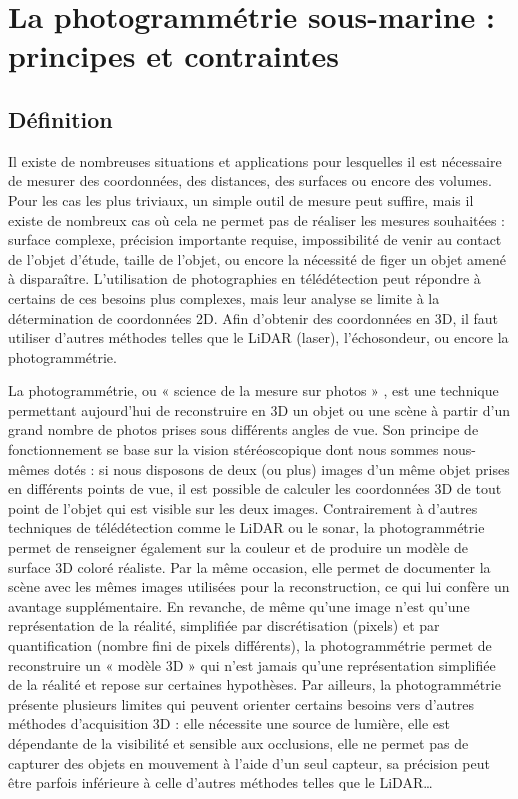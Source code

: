 \newpage

\section[La photogrammétrie sous-marine : principes et contraintes]{La photogrammétrie sous-marine : principes et contraintes}\label{methodes.2}

\subsection{Définition}

Il existe de nombreuses situations et applications pour lesquelles il est nécessaire de mesurer des coordonnées, des distances, des surfaces ou encore des volumes. Pour les cas les plus triviaux, un simple outil de mesure peut suffire, mais il existe de nombreux cas où cela ne permet pas de réaliser les mesures souhaitées : surface complexe, précision importante requise, impossibilité de venir au contact de l’objet d’étude, taille de l’objet, ou encore la nécessité de figer un objet amené à disparaître. L’utilisation de photographies en télédétection peut répondre à certains de ces besoins plus complexes, mais leur analyse se limite à la détermination de coordonnées 2D. Afin d’obtenir des coordonnées en 3D, il faut utiliser d’autres méthodes telles que le LiDAR (laser), l’échosondeur, ou encore la photogrammétrie.

La photogrammétrie, ou « science de la mesure sur photos » \citep{linder_digital_2016}, est une technique permettant aujourd’hui de reconstruire en 3D un objet ou une scène à partir d’un grand nombre de photos prises sous différents angles de vue. Son principe de fonctionnement se base sur la vision stéréoscopique dont nous sommes nous-mêmes dotés : si nous disposons de deux (ou plus) images d’un même objet prises en différents points de vue, il est possible de calculer les coordonnées 3D de tout point de l’objet qui est visible sur les deux images. Contrairement à d’autres techniques de télédétection comme le LiDAR ou le sonar, la photogrammétrie permet de renseigner également sur la couleur et de produire un modèle de surface 3D coloré réaliste. Par la même occasion, elle permet de documenter la scène avec les mêmes images utilisées pour la reconstruction, ce qui lui confère un avantage supplémentaire. En revanche, de même qu’une image n’est qu’une représentation de la réalité, simplifiée par discrétisation (pixels) et par quantification (nombre fini de pixels différents), la photogrammétrie permet de reconstruire un « modèle 3D » qui n’est jamais qu’une représentation simplifiée de la réalité et repose sur certaines hypothèses. Par ailleurs, la photogrammétrie présente plusieurs limites qui peuvent orienter certains besoins vers d’autres méthodes d’acquisition 3D : elle nécessite une source de lumière, elle est dépendante de la visibilité et sensible aux occlusions, elle ne permet pas de capturer des objets en mouvement à l’aide d’un seul capteur, sa précision peut être parfois inférieure à celle d’autres méthodes telles que le LiDAR…

